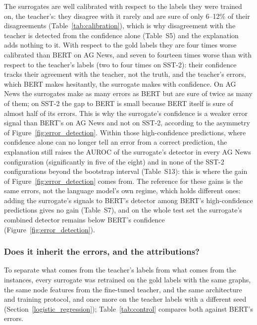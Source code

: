 \documentclass[preprint, times, review, 10pt]{elsarticle}
\begin{document}
The surrogates are well calibrated with respect to the labels they were trained on, the teacher's: they disagree with it rarely and are sure of only 6--12\% of their disagreements (Table~\ref{tab:calibration}), which is why disagreement with the teacher is detected from the confidence alone (Table~S5) and the explanation adds nothing to it. With respect to the gold labels they are four times worse calibrated than BERT on AG News, and seven to fourteen times worse than with respect to the teacher's labels (two to four times on SST-2): their confidence tracks their agreement with the teacher, not the truth, and the teacher's errors, which BERT makes hesitantly, the surrogate makes with confidence. On AG News the surrogates make as many errors as BERT but are sure of twice as many of them; on SST-2 the gap to BERT is small because BERT itself is sure of almost half of its errors. This is why the surrogate's confidence is a weaker error signal than BERT's on AG News and not on SST-2, according to the asymmetry of Figure~\ref{fig:error_detection}. Within those high-confidence predictions, where confidence alone can no longer tell an error from a correct prediction, the explanation still raises the AUROC of the surrogate's detector in every AG News configuration (significantly in five of the eight) and in none of the SST-2 configurations beyond the bootstrap interval (Table~S13): this is where the gain of Figure~\ref{fig:error_detection} comes from. The reference for these gains is the same errors, not the language model's own regime, which holds different ones: adding the surrogate's signals to BERT's detector among BERT's high-confidence predictions gives no gain (Table~S7), and on the whole test set the surrogate's combined detector remains below BERT's confidence (Figure~\ref{fig:error_detection}).

\subsubsection{Does it inherit the errors, and the attributions?} \label{sec:inherit_err}
To separate what comes from the teacher's labels from what comes from the instances, every surrogate was retrained on the gold labels with the same graphs, the same node features from the fine-tuned teacher, and the same architecture and training protocol, and once more on the teacher labels with a different seed (Section~\ref{logistic_regression}); Table~\ref{tab:control} compares both against BERT's errors.
\end{document}
